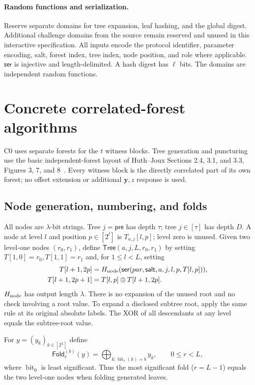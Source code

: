 \documentclass[11pt]{article}
\theoremstyle{plain}
\theoremstyle{definition}
\theoremstyle{remark}
\newcommand{\Ser}{\mathsf{ser}}
\begin{document}
\paragraph{Random functions and serialization.}
Reserve separate domains for tree expansion, leaf hashing, and the global
digest. Additional challenge domains from the source remain reserved and
unused in this interactive specification. All inputs encode the protocol
identifier, parameter encoding, salt, forest index, tree index, node position,
and role where applicable. $\Ser$ is injective and length-delimited.
A hash digest has $\ell$ bits. The domains are independent random functions.

\section{Concrete correlated-forest algorithms}\label{sec:forest}
C0 uses separate forests for the $t$ witness blocks. Tree generation and
puncturing use the basic independent-forest layout of Huth--Joux
Sections 2.4, 3.1, and 3.3, Figures 3, 7, and 8~\cite{investigation:HJ}.
Every witness block is the directly correlated part of its own forest;
no offset extension or additional $\mathbf y,z$ response is used.

\subsection{Node generation, numbering, and folds}
All nodes are $\lambda$-bit strings. Tree $j=\mathsf{pre}$ has depth $\tau$;
tree $j\in[\tau]$ has depth $D$. A node at level $l$ and position
$p\in[2^l]$ is $T_{a,j}[l,p]$; level zero is unused. Given two level-one
nodes $(r_0,r_1)$, define $\mathsf{Tree}(a,j,L,r_0,r_1)$ by setting
$T[1,0]=r_0,T[1,1]=r_1$ and, for $1\leq l<L$, setting
\begin{align}
 T[l+1,2p]&=H_{\rm node}(\Ser(par,\mathsf{salt},a,j,l,p,T[l,p])),\label{eq:expand}\\
 T[l+1,2p+1]&=T[l,p]\oplus T[l+1,2p].\nonumber
\end{align}
$H_{\rm node}$ has output length $\lambda$. There is no expansion of the
unused root and no check involving a root value. To expand a disclosed
subtree root, apply the same rule at its original absolute labels.
The XOR of all descendants at any level equals the subtree-root value.

For $y=(y_k)_{k\in[2^L]}$ define
\[
 \mathsf{Fold}_{r}^{(b)}(y)=\bigoplus_{k:\operatorname{bit}_r(k)=b}y_k,
 \qquad 0\leq r<L,
\]
where $\operatorname{bit}_0$ is least significant. Thus the most significant
fold ($r=L-1$) equals the two level-one nodes when folding generated leaves.
\end{document}
